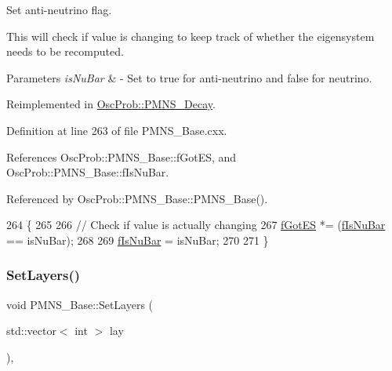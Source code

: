 Set anti-\/neutrino flag.

This will check if value is changing to keep track of whether the eigensystem needs to be recomputed.


\begin{DoxyParams}{Parameters}
{\em is\+Nu\+Bar} & -\/ Set to true for anti-\/neutrino and false for neutrino. \\
\hline
\end{DoxyParams}


Reimplemented in \hyperlink{classOscProb_1_1PMNS__Decay_a60b2c35652e73d8f6a087f3f2f3c9de6}{Osc\+Prob\+::\+P\+M\+N\+S\+\_\+\+Decay}.



Definition at line 263 of file P\+M\+N\+S\+\_\+\+Base.\+cxx.



References Osc\+Prob\+::\+P\+M\+N\+S\+\_\+\+Base\+::f\+Got\+ES, and Osc\+Prob\+::\+P\+M\+N\+S\+\_\+\+Base\+::f\+Is\+Nu\+Bar.



Referenced by Osc\+Prob\+::\+P\+M\+N\+S\+\_\+\+Base\+::\+P\+M\+N\+S\+\_\+\+Base().


\begin{DoxyCode}
264 \{
265 
266   \textcolor{comment}{// Check if value is actually changing}
267   \hyperlink{classOscProb_1_1PMNS__Base_a6dc5cd010d2d70b2324745b4e53e9839}{fGotES} *= (\hyperlink{classOscProb_1_1PMNS__Base_a0ebaeaefab36a3ff381c6293faedfdd6}{fIsNuBar} == isNuBar);
268 
269   \hyperlink{classOscProb_1_1PMNS__Base_a0ebaeaefab36a3ff381c6293faedfdd6}{fIsNuBar} = isNuBar;
270 
271 \}
\end{DoxyCode}
\mbox{\label{classOscProb_1_1PMNS__Base_a904e580edf89fb98bf9a6397739b4ebe}} 
\subsubsection{\texorpdfstring{Set\+Layers()}{SetLayers()}}
{\footnotesize\ttfamily void P\+M\+N\+S\+\_\+\+Base\+::\+Set\+Layers (\begin{DoxyParamCaption}\item[{std\+::vector$<$ int $>$}]{lay }\end{DoxyParamCaption})\hspace{0.3cm}{\ttfamily [virtual]}, {\ttfamily [inherited]}}

